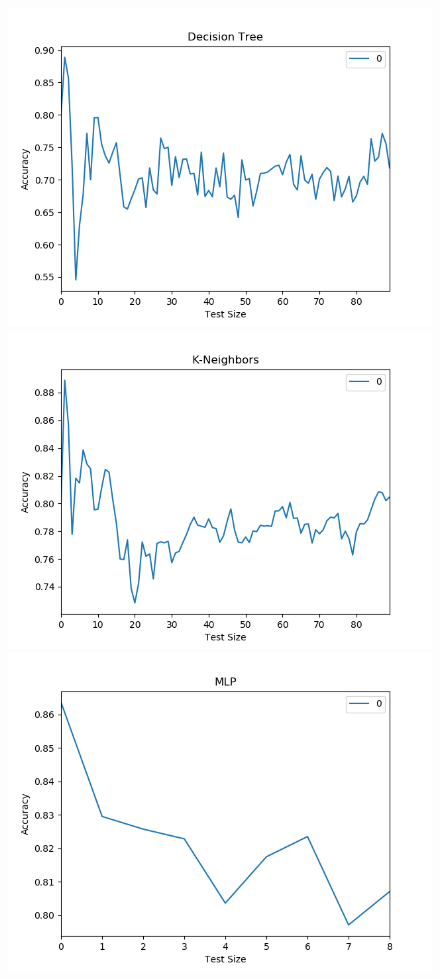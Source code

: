 \documentclass{article}
\begin{document}
\begin{figure}
 \begin{center}
	\includegraphics[scale=0.4]{dt_test_size}
	\includegraphics[scale=0.4]{kn_test_size}
	\includegraphics[scale=0.4]{mlp_test_size}

\end{center}
\end{figure}
\end{document}
